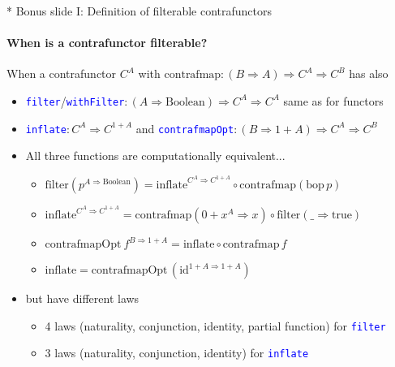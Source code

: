 \documentclass[english]{beamer}
\begin{document}
\begin{frame}{{*} Bonus slide I: Definition of filterable contrafunctors}

\framesubtitle{When is a contrafunctor filterable?}

When a contrafunctor {\footnotesize{}$C^{A}$} with {\footnotesize{}$\text{contrafmap}:\left(B\Rightarrow A\right)\Rightarrow C^{A}\Rightarrow C^{B}$}
has also
\begin{itemize}
\item \texttt{\textcolor{blue}{\footnotesize{}filter}}/\texttt{\textcolor{blue}{\footnotesize{}withFilter}}{\footnotesize{}$:\left(A\Rightarrow\text{Boolean}\right)\Rightarrow C^{A}\Rightarrow C^{A}$}
\textendash{} same as for functors
\item \texttt{\textcolor{blue}{\footnotesize{}inflate}}{\footnotesize{}$:C^{A}\Rightarrow C^{1+A}$}
and \texttt{\textcolor{blue}{\footnotesize{}contrafmapOpt}}{\footnotesize{}$:\left(B\Rightarrow1+A\right)\Rightarrow C^{A}\Rightarrow C^{B}$}{\footnotesize \par}
\item All three functions are computationally equivalent...
\begin{itemize}
\item {\footnotesize{}$\text{filter}(p^{A\Rightarrow\text{Boolean}})=\text{inflate}^{C^{A}\Rightarrow C^{1+A}}\circ\text{contrafmap}(\text{bop}\,p)$}{\footnotesize \par}
\item {\footnotesize{}$\text{inflate}^{C^{A}\Rightarrow C^{1+A}}=\text{contrafmap}\left(0+x^{A}\Rightarrow x\right)\circ\text{filter}\left(\_\Rightarrow\text{true}\right)$}{\footnotesize \par}
\item {\footnotesize{}$\text{contrafmapOpt}\:f^{B\Rightarrow1+A}=\text{inflate}\circ\text{contrafmap}\,f$}{\footnotesize \par}
\item {\footnotesize{}$\text{inflate}=\text{contrafmapOpt}\,(\text{id}^{1+A\Rightarrow1+A})$}{\footnotesize \par}
\end{itemize}
\item but have different laws
\begin{itemize}
\item 4 laws (naturality, conjunction, identity, partial function) for \texttt{\textcolor{blue}{\footnotesize{}filter}} 
\item 3 laws (naturality, conjunction, identity) for \texttt{\textcolor{blue}{\footnotesize{}inflate}} 

\end{itemize}
\end{itemize}
\end{frame}
\end{document}
